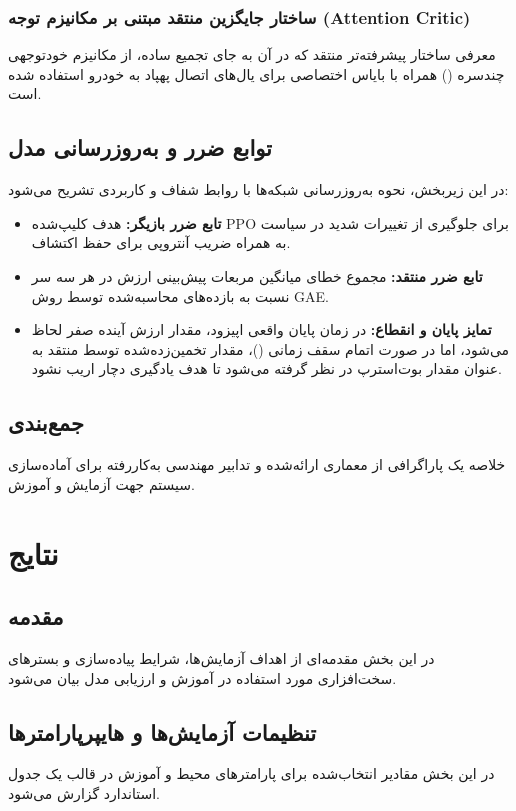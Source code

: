 \documentclass[a4paper,12pt,oneside]{report}
\begin{document}
\subsection{ساختار جایگزین منتقد مبتنی بر مکانیزم توجه (Attention Critic)}
معرفی ساختار پیشرفته‌تر منتقد که در آن به جای تجمیع ساده، از مکانیزم خود‌توجهی چندسره () همراه با بایاس اختصاصی برای یال‌های اتصال پهپاد به خودرو استفاده شده است.

\section{توابع ضرر و به‌روزرسانی مدل}
در این زیربخش، نحوه به‌روزرسانی شبکه‌ها با روابط شفاف و کاربردی تشریح می‌شود:
\begin{itemize}
    \item \textbf{تابع ضرر بازیگر:} هدف کلیپ‌شده PPO برای جلوگیری از تغییرات شدید در سیاست به همراه ضریب آنتروپی برای حفظ اکتشاف.
    \item \textbf{تابع ضرر منتقد:} مجموع خطای میانگین مربعات پیش‌بینی ارزش در هر سه سر نسبت به بازده‌های محاسبه‌شده توسط روش GAE.
    \item \textbf{تمایز پایان و انقطاع:} در زمان پایان واقعی اپیزود، مقدار ارزش آینده صفر لحاظ می‌شود، اما در صورت اتمام سقف زمانی ()، مقدار تخمین‌زده‌شده توسط منتقد به عنوان مقدار بوت‌استرپ در نظر گرفته می‌شود تا هدف یادگیری دچار اریب نشود.
\end{itemize}

\section{جمع‌بندی}
خلاصه یک پاراگرافی از معماری ارائه‌شده و تدابیر مهندسی به‌کاررفته برای آماده‌سازی سیستم جهت آزمایش و آموزش.

\chapter{نتایج}

\section{مقدمه}
در این بخش مقدمه‌ای از اهداف آزمایش‌ها، شرایط پیاده‌سازی و بسترهای سخت‌افزاری مورد استفاده در آموزش و ارزیابی مدل بیان می‌شود.

\section{تنظیمات آزمایش‌ها و هایپرپارامترها}
در این بخش مقادیر انتخاب‌شده برای پارامترهای محیط و آموزش در قالب یک جدول استاندارد گزارش می‌شود.
\end{document}
